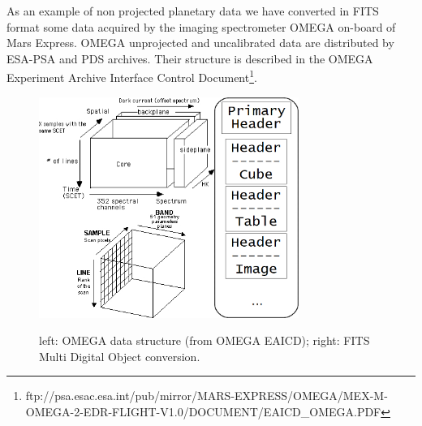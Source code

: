 As an example of non projected planetary data we have converted in FITS format some data
acquired by the imaging spectrometer OMEGA on-board of Mars Express.
OMEGA unprojected and uncalibrated data are distributed by ESA-PSA and PDS archives.
Their structure is described in the OMEGA Experiment Archive 
Interface Control Document\footnote{ftp://psa.esac.esa.int/pub/mirror/MARS-EXPRESS/OMEGA/MEX-M-OMEGA-2-EDR-FLIGHT-V1.0/DOCUMENT/EAICD\_OMEGA.PDF}.
\begin{figure}[ht!]
\centerline{\includegraphics[height=17pc]{ess_marmo4}\hspace{60pt}\includegraphics[height=17pc]{ess_marmo3}}
\caption{left: OMEGA data structure (from OMEGA EAICD); right: FITS Multi Digital Object
conversion.}
\label{fig:omegascheme}
\end{figure}

